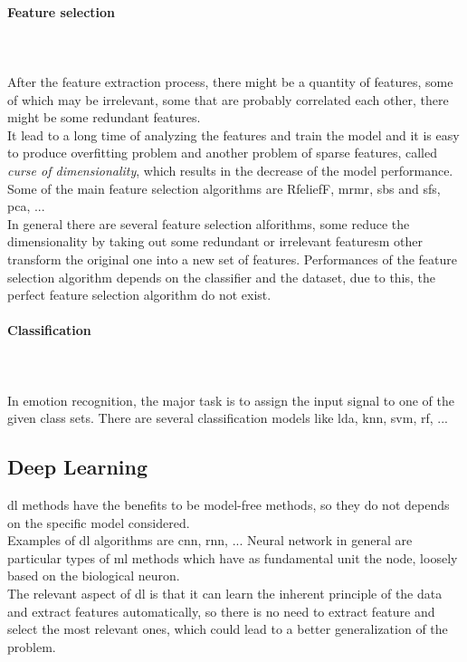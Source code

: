 \paragraph{Feature selection}
\mbox{} \\ \\ \indent
After the feature extraction process, there might be a quantity of features, some of which may be irrelevant, some that are probably correlated each other, there might be some redundant features.
\\
It lead to a long time of analyzing the features and train the model and it is easy to produce overfitting problem and another problem of sparse features, called \textit{curse of dimensionality}, which results in the decrease of the model performance.
\\
Some of the main feature selection algorithms are RfeliefF, \gls{mrmr}, \gls{sbs} and \gls{sfs}, \gls{pca}, ...
\\ \indent
In general there are several feature selection alforithms, some reduce the dimensionality by taking out some redundant or irrelevant featuresm other transform the original one into a new set of features. Performances of the feature selection algorithm depends on the classifier and the dataset, due to this, the perfect feature selection algorithm do not exist.

\paragraph{Classification}
\mbox{} \\ \\ \indent
In emotion recognition, the major task is to assign the input signal to one of the given class sets. There are several classification models like \gls{lda}, \gls{knn}, \gls{svm}, \gls{rf}, ...

\subsection{Deep Learning}
\gls{dl} methods have the benefits to be model-free methods, so they do not depends on the specific model considered.
\\
Examples of \gls{dl} algorithms are \gls{cnn}, \gls{rnn}, ... Neural network in general are particular types of \gls{ml} methods which have as fundamental unit the node, loosely based on the biological neuron. 
\\ \indent
The relevant aspect of \gls{dl} is that it can learn the inherent principle of the data and extract features automatically, so there is no need to extract feature and select the most relevant ones, which could lead to a better generalization of the problem.

